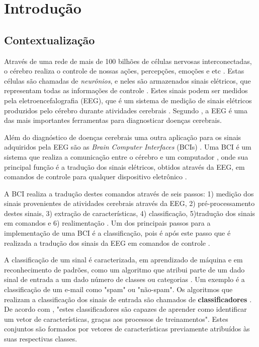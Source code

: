 \chapter[Introdução]{Introdução}

\section{Contextualização}

Através de uma rede de mais de 100 bilhões de células nervosas interconectadas, o cérebro realiza o controle de nossas ações, percepções, emoções e etc \cite{KANDEL}. Estas células são chamadas de \textit{neurônios}, e neles são armazenados sinais elétricos, que representam todas as informações de controle \cite{Siulybook}. Estes sinais podem ser medidos pela eletroencefalografia (EEG), que é um sistema de medição de sinais elétricos produzidos pelo cérebro durante atividades cerebrais \cite{F.Lotte}. Segundo \cite{SIULYDissertacao}, a EEG é uma das mais importantes ferramentas para diagnosticar doenças cerebrais.

Além do diagnóstico de doenças cerebrais uma outra aplicação para os sinais adquiridos pela EEG são as \textit{Brain Computer Interfaces} (BCIs) \cite{F.Lotte}. Uma BCI é um sistema que realiza a comunicação entre o cérebro e um computador \cite{Siulybook}, onde sua principal função é a tradução dos sinais elétricos, obtidos através da EEG, em comandos de controle para qualquer dispositivo eletrônico \cite{Siulybook}.

A BCI realiza a tradução destes comandos através de seis passos: 1) medição dos sinais provenientes de atividades cerebrais através da EEG, 2) pré-processamento destes sinais, 3) extração de características, 4) classificação, 5)tradução dos sinais em comandos e 6) realimentação \cite{MasonAndBirch}. Um dos principais passos para a implementação de uma BCI é a classificação, pois é após este passo que é realizada a tradução dos sinais da EEG em comandos de controle \cite{MasonAndBirch}.

A classificação de um sinal é caracterizada, em aprendizado de máquina e em reconhecimento de padrões, como um algoritmo que atribui parte de um dado sinal de entrada a um dado número de classes ou categorias \cite{brunelli2009template}. Um exemplo é a classificação de um e-mail como "spam" ou "não-spam". Os algoritmos que realizam a classificação dos sinais de entrada são chamados de \textbf{classificadores} \cite{Siulybook}. De acordo com \cite{lottephd}, "estes classificadores são capazes de aprender como identificar um vetor de características, graças aos processos de treinamentos". Estes conjuntos são formados por vetores de características previamente atribuídos às suas respectivas classes.

